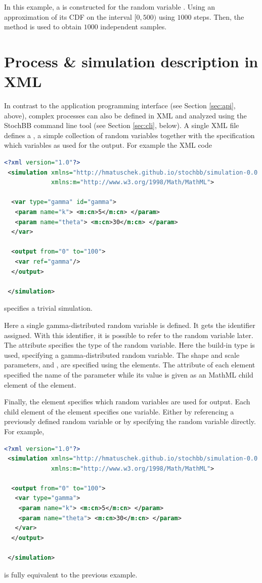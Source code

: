 \documentclass[a4paper, 10pt]{paper}
\begin{document}
In this example, a  is constructed for the random variable . Using an
approximation of its CDF on the interval $[0,500)$ using $1000$ steps. Then, the
 method is used to obtain $1000$ independent samples.


\section{Process \& simulation description in XML} \label{sec:xml}
In contrast to the application programming interface (see Section \ref{sec:api}, above), 
complex processes can also be defined in XML and analyzed using the
StochBB command line tool (see Section \ref{sec:cli}, below). A single XML file defines a 
, a simple collection of random variables together with the specification which
variables as used for the output. For example the XML code
\begin{lstlisting}[language=XML]
 <?xml version="1.0"?>
 <simulation xmlns="http://hmatuschek.github.io/stochbb/simulation-0.0.dtd"
             xmlns:m="http://www.w3.org/1998/Math/MathML">

  <var type="gamma" id="gamma">
   <param name="k"> <m:cn>5</m:cn> </param>
   <param name="theta"> <m:cn>30</m:cn> </param>
  </var>

  <output from="0" to="100">
   <var ref="gamma"/>
  </output>

 </simulation>
\end{lstlisting}
specifies a trivial simulation.

Here a single gamma-distributed random variable is defined.
It gets the identifier  assigned. With this identifier, it is possible to refer to the random
variable later. The  attribute specifies the type of the random variable. Here the
build-in type  is used, specifying a gamma-distributed random variable. The shape and
scale parameters,  and , are specified using the  elements. 
The  attribute of each  element specified the name of the parameter while 
its value is given as an MathML child element of the  element.

Finally, the  element specifies which random variables are used for output. Each child
element of the  element specifies one variable. Either by referencing a previously defined
random variable or by specifying the random variable directly. For example,
\begin{lstlisting}[language=XML]
 <?xml version="1.0"?>
 <simulation xmlns="http://hmatuschek.github.io/stochbb/simulation-0.0.dtd"
             xmlns:m="http://www.w3.org/1998/Math/MathML">

  <output from="0" to="100">
   <var type="gamma">
    <param name="k"> <m:cn>5</m:cn> </param>
    <param name="theta"> <m:cn>30</m:cn> </param>
   </var>
  </output>

 </simulation>
\end{lstlisting}
is fully equivalent to the previous example.
\end{document}

